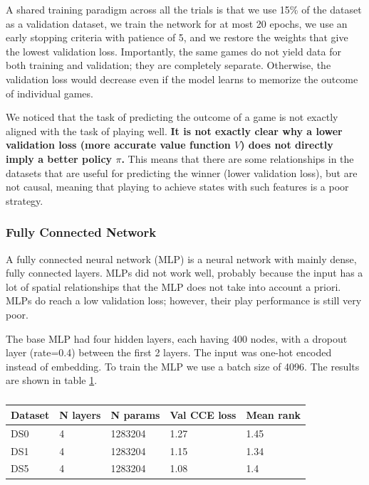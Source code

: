 \documentclass{article}
\begin{document}
A shared training paradigm across all the trials is that we use 15\% of the dataset as a validation dataset, we train the network for at most 20 epochs, we use an early stopping criteria with patience of 5, and we restore the weights that give the lowest validation loss. Importantly, the same games do not yield data for both training and validation; they are completely separate. Otherwise, the validation loss would decrease even if the model learns to memorize the outcome of individual games.

We noticed that the task of predicting the outcome of a game is not exactly aligned with the task of playing well. \textbf{It is not exactly clear why a lower validation loss (more accurate value function $V$) does not directly imply a better policy $\pi$.} This means that there are some relationships in the datasets that are useful for predicting the winner (lower validation loss), but are not causal, meaning that playing to achieve states with such features is a poor strategy.



\subsubsection{Fully Connected Network}
A fully connected neural network (MLP) is a neural network with mainly dense, fully connected layers. MLPs did not work well, probably because the input has a lot of spatial relationships that the MLP does not take into account a priori. MLPs do reach a low validation loss; however, their play performance is still very poor.


The base MLP had four hidden layers, each having 400 nodes, with a dropout layer (rate=0.4) between the first 2 layers. The input was one-hot encoded instead of embedding. To train the MLP we use a batch size of 4096. The results are shown in table \ref{tbl:mlp_res}.
\begin{table}[]
\centering
\label{tbl:mlp_res}
\begin{tabular}{|l|l|l|l|l|}
\hline
Dataset & N layers & N params & Val CCE loss & Mean rank \\ \hline
DS0 & 4& 1283204& 1.27& 1.45 \\ \hline
DS1 & 4& 1283204& 1.15 & 1.34 \\ \hline
DS5 & 4& 1283204& 1.08 & 1.4 \\ \hline
\end{tabular}
\caption{}
\end{table}
\end{document}
